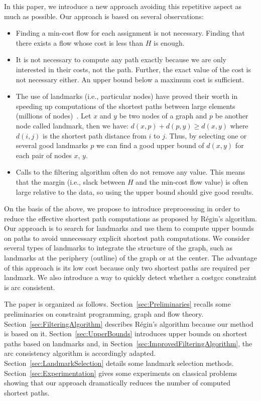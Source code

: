 In this paper, we introduce a new approach avoiding this repetitive aspect as much as possible. Our approach is based on several observations:
\begin{itemize}
    \item Finding a min-cost flow for each assignment is not necessary. Finding that there exists a flow whose cost is less than $H$ is enough. 
\item 
It is not necessary to compute any path exactly because we are only interested in their costs, not the path. Further, the exact value of the cost is not necessary either. An upper bound below a maximum cost is sufficient.
\item The use of landmarks (i.e., particular nodes) have proved their worth in speeding up computations of the shortest paths between large elements (millions of nodes)~\cite{Goldberg:ComputingtheShortestPath:ASearchMeetsGraphTheory}. 
Let $x$ and $y$ be two nodes of a graph and $p$ be another node called landmark, then we have: $d(x,p)+d(p,y) \geq d(x,y)$ where $d(i,j)$ is the shortest path distance from $i$ to $j$. Thus, by selecting one or several good landmarks $p$ we can find a good upper bound of $d(x,y)$ for each pair of nodes $x$, $y$.
\item Calls to the filtering algorithm often do not remove any value. This means that the margin (i.e., slack between $H$ and the min-cost flow value) is often large relative to the data, so using the upper bound should give good results.
\end{itemize}

On the basis of the above, we propose to introduce preprocessing in order to reduce the effective shortest path computations as proposed by Régin's algorithm.
Our approach is to search for landmarks and use them to compute upper bounds on paths to avoid unnecessary explicit shortest path computations. We consider several types of landmarks to integrate the structure of the graph, such as landmarks at the periphery (outline) of the graph or at the center. The advantage of this approach is its low cost because only two shortest paths are required per landmark. We also introduce a way to quickly detect whether a costgcc constraint is arc consistent. 

The paper is organized as follows. Section~\ref{sec:Preliminaries}
recalls some preliminaries on constraint programming, graph and flow theory. Section~\ref{sec:FilteringAlgorithm} describes Régin's algorithm because our method is based on it. 
Section~\ref{sec:UpperBounds} introduces upper bounds on shortest paths based on landmarks and, in Section~\ref{sec:ImprovedFilteringAlgorithm}, the arc consistency algorithm is accordingly adapted. Section~\ref{sec:LandmarkSelection} details some landmark selection methods. Section~\ref{sec:Experimentation} 
gives some experiments on classical problems showing that our approach dramatically reduces the number of computed shortest paths. 